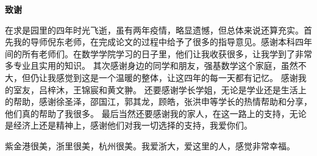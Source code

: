 \cleardoublepage{}
\begin{center}
    \bfseries {} 致谢
\end{center}

在求是园里的四年时光飞逝，虽有两年疫情，略显遗憾，但总体来说还算充实。首先我的导师倪东老师，在完成论文的过程中给予了很多的指导意见。感谢本科四年间的所有老师们。在数学学院学习的日子里，他们让我收获很多，让我学到了非常多专业且实用的知识。
其次感谢身边的同学和朋友，强基数学这个家庭，虽然不大，但仍让我感觉到这是一个温暖的整体，让这四年的每一天都有记忆。
感谢我的室友，吕梓沐，王锦宸和黄文翀。
还要感谢学长学姐，无论是学业还是生活上的帮助，感谢徐圣泽，邵国江，郭其龙，顾皓，张洪申等学长的热情帮助和分享，他们真的帮助了我很多。
最后当然还要感谢我的家人，在这一路上的支持，无论是经济上还是精神上，感谢他们对我一切选择的支持，我爱你们。

紫金港很美，浙里很美，杭州很美。我爱浙大，爱这里的人，感觉非常幸福。